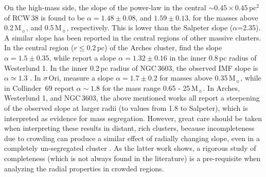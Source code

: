 \documentclass[a4paper,fleqn,usenatbib]{mnras}
\begin{document}
On the high-mass side, the slope of the power-law in the central $\sim0.45\times0.45$\,pc$^2$ of RCW\,38 is 
found to be $\alpha=1.48 \pm 0.08$, and $1.59 \pm 0.13$, for the masses above 0.2\,M$_{\sun}$, and 0.5\,M$_{\sun}$, respectively.
This is lower than the Salpeter slope ($\alpha$=2.35). A similar slope has been 
reported in the central regions of other massive clusters. 
In the central region ($r \leq 0.2\,$pc) of the Arches cluster, \citet{habibi13} find the slope $\alpha=1.5\pm0.35$, while
\citet{andersen16} report a slope $\alpha = 1.32 \pm 0.16$ in the inner 0.8\,pc radius of Westerlund 1.  
In the inner 0.2\,pc radius of NGC\,3603, the observed IMF slope is $\alpha\simeq1.3$ \citep{harayama08, stolte06}.  
In $\sigma\,$Ori, \citet{penaramirez12} measure a slope $\alpha = 1.7 \pm 0.2$ for masses above 0.35\,M$_{\sun}$, while
in Collinder~69 \citet{bayo11} report $\alpha\sim1.8$ for the mass range 0.65 - 25\,M$_{\sun}$.
In Arches, Westerlund 1, and NGC\,3603, the above mentioned works all report a steepening of the observed slope
at larger radii (to values from 1.8 to Salpeter), which is interpreted as evidence for mass segregation. However, 
great care should be taken when interpreting these results in distant, rich clusters, because incompleteness due to crowding 
can produce a similar effect of radially changing slope, even 
in a completely un-segregated cluster \citep{ascenso09}. As the latter work shows, 
a rigorous study of completeness (which is not always found in the literature) is a pre-requisite when analyzing the radial properties 
in crowded regions. 
\end{document}
